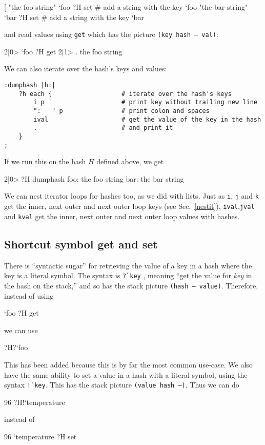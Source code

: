 \begin{v}
[%
"the foo string" `foo ?H set    # add a string with the key `foo
"the bar string" `bar ?H set    # add a string with the key `bar
\end{v}
and read values using \texttt{get} which has the picture \texttt{(key hash -- val)}:
\begin{v}
2|0> `foo ?H get
2|1> .
the foo string
\end{v}
We can also iterate over the hash's keys and values:
\begin{lstlisting}
:dumphash |h:|
    ?h each {                   # iterate over the hash's keys
        i p                     # print key without trailing new line
        ":   " p                # print colon and spaces
        ival                    # get the value of the key in the hash
        .                       # and print it
    }
;
\end{lstlisting}
If we run this on the hash $H$ defined above, we get
\begin{v}
2|0> ?H dumphash
foo:   the foo string
bar:   the bar string
\end{v}
We can nest iterator loops for hashes too, as we did with lists.
Just as \texttt{i}, \texttt{j} and \texttt{k} get the inner, next outer
and next outer loop keys (see Sec.~\ref{nestit}), \texttt{ival},\texttt{jval} and \texttt{kval} get
the inner, next outer and next outer loop values with hashes.


\subsection{Shortcut symbol get and set}
There is ``syntactic sugar'' for retrieving the value of a key in
a hash where the key is a literal symbol. 
The syntax is \verb+?`key+ , meaning
``get the value for \emph{key} in the hash on the stack,'' and so has the stack picture \texttt{(hash -- value)}.
Therefore, instead of using
\begin{v}
`foo ?H get
\end{v}
we can use
\begin{v}
?H?`foo
\end{v}
This has been added because this is by far the most common use-case.
We also have the same ability to set a value in a hash with a literal
symbol, using the syntax \verb+!`key+. This has the stack picture \texttt{(value hash --)}.
Thus we can do
\begin{v}
96 ?H!`temperature
\end{v}
instead of
\begin{v}
96 `temperature ?H set
\end{v}
